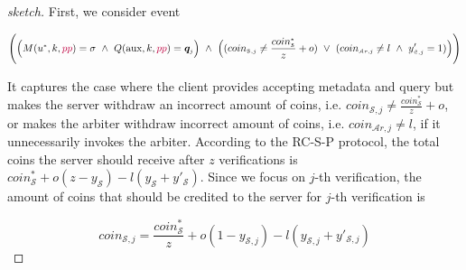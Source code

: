 \begin{proof}[sketch]
  First, we consider event 
  
   $$\Bigg(\Big(M(u^{\scriptscriptstyle *},k,\textcolor{purple}{pp})= \sigma \  \wedge \ Q(\text{aux},k, \textcolor{purple}{pp})= \bm{q}_{\scriptscriptstyle j}\Big)\ \wedge \
  \Big((coin_{\scriptscriptstyle\mathcal{S},j}\neq  \frac{coin_{\scriptscriptstyle\mathcal S}^{\scriptscriptstyle*}}{z}+o)\ \vee \ (coin_{\scriptscriptstyle\mathcal{A}r,j}\neq l\ \wedge\  y'_{\scriptscriptstyle \mathcal {C},j}=1)\Big)\Bigg)$$
  
  
  It captures the case where the client provides  accepting metadata and query  but makes the server withdraw an incorrect amount of coins, i.e. $coin_{\scriptscriptstyle\mathcal{S},j}\neq  \frac{coin_{\scriptscriptstyle\mathcal S}^{\scriptscriptstyle*}}{z}+o$, or makes the arbiter withdraw incorrect amount of coins, i.e. $coin_{\scriptscriptstyle\mathcal{A}r,j}\neq l$, if it unnecessarily invokes the arbiter. According to the RC-S-P protocol, the total coins the server should receive after $z$ verifications is $coin^{\scriptscriptstyle *}_{\scriptscriptstyle\mathcal S}+o(z-y_{\scriptscriptstyle\mathcal S})-l(y_{\scriptscriptstyle\mathcal S}+y'_{\scriptscriptstyle\mathcal S})$. Since we focus on  $j$-th verification, the amount of  coins that should be credited to the server for $j$-th verification is
  
  \begin{equation}\label{equ::what-server-recives-in-j}
   coin_{\scriptscriptstyle\mathcal{S},j}=\frac{coin^{\scriptscriptstyle *}_{\scriptscriptstyle\mathcal S}}{z}+o(1-y_{\scriptscriptstyle\mathcal {S},j})-l(y_{\scriptscriptstyle\mathcal {S},j}+y'_{\scriptscriptstyle\mathcal {S},j})
     \end{equation}
  
  
  

\end{proof}
